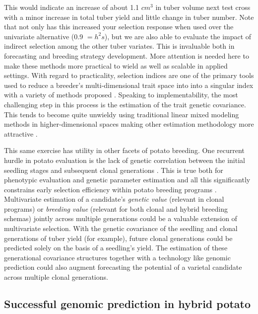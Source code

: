 \documentclass[
]{article}
\begin{document}
This would indicate an increase of about 1.1 \(cm^3\) in tuber volume
next test cross with a minor increase in total tuber yield and little
change in tuber number. Note that not only has this increased your
selection response when used over the univariate alternative (0.9
\(= h^2 s\)), but we are also able to evaluate the impact of indirect
selection among the other tuber variates. This is invaluable both in
forecasting and breeding strategy development. More attention is needed
here to make these methods more practical to wield as well as scalable
in applied settings. With regard to practicality, selection indices are
one of the primary tools used to reduce a breeder's multi-dimensional
trait space into into a singular index with a variety of methods
proposed \autocite{Kempthorne1959,Bulmer1981}. Speaking to
implementability, the most challenging step in this process is the
estimation of the trait genetic covariance. This tends to become quite
unwieldy using traditional linear mixed modeling methods in
higher-dimensional spaces making other estimation methodology more
attractive \autocite{Blows2009,Runcie2013}.

This same exercise has utility in other facets of potato breeding. One
recurrent hurdle in potato evaluation is the lack of genetic correlation
between the initial seedling stages and subsequent clonal generations
\autocite{Maris1988}. This is true both for phenotypic evaluation and
genetic parameter estimation and all this significantly constrains early
selection efficiency within potato breeding programs
\autocite{Davies1974,Gopal1998}. Multivariate estimation of a
candidate's \emph{genetic value} (relevant in clonal programs) or
\emph{breeding value} (relevant for both clonal and hybrid breeding
schemas) jointly across multiple generations could be a valuable
extension of multivariate selection. With the genetic covariance of the
seedling and clonal generations of tuber yield (for example), future
clonal generations could be predicted solely on the basis of a
seedling's yield. The estimation of these generational covariance
structures together with a technology like genomic prediction could also
augment forecasting the potential of a varietal candidate across
multiple clonal generations.

\subsection{Successful genomic prediction in hybrid
potato}\label{successful-genomic-prediction-in-hybrid-potato}
\end{document}
